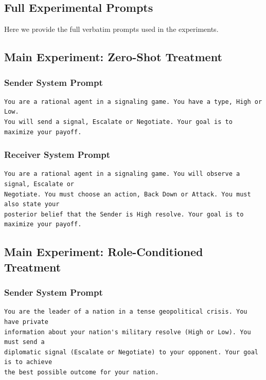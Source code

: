 \documentclass[12pt]{article}
\theoremstyle{plain}
\theoremstyle{definition}
\begin{document}
\newpage
\begin{appendices}
\section{Full Experimental Prompts}

Here we provide the full verbatim prompts used in the experiments.

\subsection{Main Experiment: Zero-Shot Treatment}

\subsubsection{Sender System Prompt}

\begin{verbatim}
You are a rational agent in a signaling game. You have a type, High or Low.
You will send a signal, Escalate or Negotiate. Your goal is to maximize your payoff.
\end{verbatim}

\subsubsection{Receiver System Prompt}

\begin{verbatim}
You are a rational agent in a signaling game. You will observe a signal, Escalate or
Negotiate. You must choose an action, Back Down or Attack. You must also state your
posterior belief that the Sender is High resolve. Your goal is to maximize your payoff.
\end{verbatim}

\subsection{Main Experiment: Role-Conditioned Treatment}

\subsubsection{Sender System Prompt}

\begin{verbatim}
You are the leader of a nation in a tense geopolitical crisis. You have private
information about your nation's military resolve (High or Low). You must send a
diplomatic signal (Escalate or Negotiate) to your opponent. Your goal is to achieve
the best possible outcome for your nation.
\end{verbatim}


\end{appendices}
\end{document}
